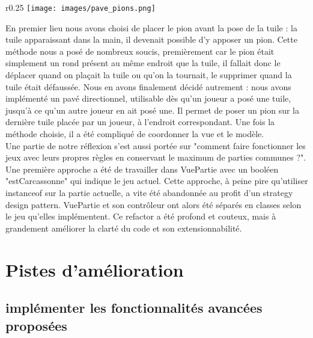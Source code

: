 \documentclass{article}
\begin{document}
    
\begin{wrapfigure}{r}{0.25\textwidth} 
    \centering
    \texttt{[image: images/pave\_pions.png]}
\end{wrapfigure}

En premier lieu nous avons choisi de placer le pion avant la pose de la tuile : la tuile apparaissant dans la main, il devenait possible d'y apposer un pion. Cette méthode nous a posé de nombreux soucis, premièrement car le pion était simplement un rond présent au même endroit que la tuile, il fallait donc le déplacer quand on plaçait la tuile ou qu'on la tournait, le supprimer quand la tuile était défaussée. Nous en avons finalement décidé autrement : nous avons implémenté un pavé directionnel, utilisable dès qu'un joueur a posé une tuile, jusqu'à ce qu'un autre joueur en ait posé une. Il permet de poser un pion sur la dernière tuile placée par un joueur, à l'endroit correspondant. Une fois la méthode choisie, il a été compliqué de coordonner la vue et le modèle.\\

Une partie de notre réflexion s'est aussi portée sur "comment faire fonctionner les jeux avec leurs propres règles en conservant le maximum de parties communes ?". Une première approche a été de travailler dans VuePartie avec un booléen "estCarcassonne" qui indique le jeu actuel. Cette approche, à peine pire qu'utiliser instanceof sur la partie actuelle, a vite été abandonnée au profit d'un strategy design pattern. VuePartie et son contrôleur ont alors été séparés en classes selon le jeu qu'elles implémentent. Ce refactor a été profond et couteux, mais à grandement améliorer la clarté du code et son extensionnabilité.




\section{Pistes d'amélioration}

\subsection{implémenter les fonctionnalités avancées proposées}
\end{document}
